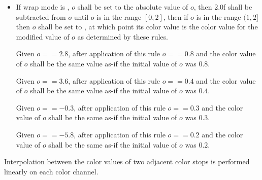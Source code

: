 \begin{enumeratea}
\begin{itemize}
	\item If wrap mode is , $o$ shall be set to the absolute value of $o$, then 2.0f shall be subtracted from $o$ until $o$ is in the range $[0,2]$, then if $o$ is in the range $(1,2]$ then $o$ shall be set to , at which point its color value is the color value for the modified value of $o$ as determined by these rules.
	\begin{example}
	Given $o == 2.8$, after application of this rule $o == 0.8$ and the color value of $o$ shall be the same value as-if the initial value of $o$ was $0.8$.
	
	Given $o == 3.6$, after application of this rule $o == 0.4$ and the color value of $o$ shall be the same value as-if the initial value of $o$ was $0.4$.
	
	Given $o == -0.3$, after application of this rule $o == 0.3$ and the color value of $o$ shall be the same as-if the initial value of $o$ was $0.3$.
	
	Given $o == -5.8$, after application of this rule $o == 0.2$ and the color value of $o$ shall be the same as-if the initial value of $o$ was $0.2$.
	\end{example}
	\end{itemize}
\end{enumeratea}

\pnum
Interpolation between the color values of two adjacent color stops is performed linearly on each color channel.
